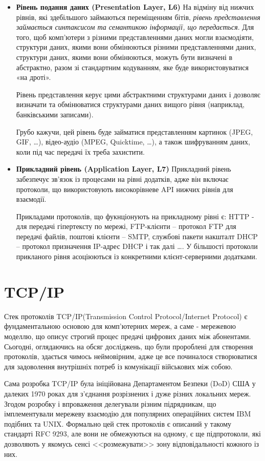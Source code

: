 \begin{itemize}
    \item \textbf{Рівень подання даних (Presentation Layer, L6)}
    На відміну від нижчих рівнів, які здебільшого займаються переміщенням бітів, \textit{рівень представлення займається синтаксисом та семантикою інформації, що передається}. Для того, щоб комп'ютери з різними представленнями даних могли взаємодіяти, структури даних, якими вони обмінюються різними представленнями даних, структури даних, якими вони обмінюються, можуть бути визначені в абстрактно, разом зі стандартним кодуванням, яке буде використовуватися «на дроті». 
    
    Рівень представлення керує цими абстрактними структурами даних і дозволяє визначати та обмінюватися структурами даних вищого рівня (наприклад, банківськими записами).

    Грубо кажучи, цей рівень буде займатися представленням картинок (JPEG, GIF, \dots), відео-аудіо (MPEG, Quicktime, \dots), а також шифруванням даних, коли під час передачі їх треба захистити.
    

    \item \textbf{Прикладний рівень (Application Layer, L7)}
    Прикладний рівень забезпечує зв'язок із процесами на рівні додатків, адже він включає протоколи, що використовують високорівневе API нижчих рівнів для взаємодії. 
    
    Прикладами протоколів, що фукнціонують на прикладному рівні є: HTTP - для передачі гіпертексту по мережі, FTP-клієнти -- протокол FTP для передачі файлів, поштові клієнти -- SMTP, службові пакети накшталт DHCP -- протокол призначення IP-адрес DHCP і так далі \dots. У більшості протоколи прикланого рівня асоціюються із конкретними клієнт-серверними додатками.    
\end{itemize}


\section{TCP/IP}

Стек протоколів TCP/IP(Transmission Control Protocol/Internet Protocol) є фундаментальною основою для комп'ютерних мереж, а саме - мережевою моделлю, що описує строгий процес предачі цифрових даних між абонентами. Сьогодні, оглядаючись на обсяг досліджень, що були пророблені для створення протоколів, здається чимось неймовірним, адже це все починалося створюватися для задоволення внутрішніх потреб із комунікації військових між собою.

Сама розробка TCP/IP була ініційована Департаментом Безпеки (DoD) США у далеких 1970 роках для з'єднання розрізнених і дуже різних локальних мереж. Згодом розробку і впроваження делегували різним підрядникам, що імплементували мережеву взаємодію для популярних операційних систем IBM подібних та UNIX. Формально цей стек протоколів є описаний у такому стандарті RFC 9293, але вони не обмежуються на одному, є ще підпротоколи, які дозволяють у якомусь сенсі <<розмежувати>> зону відповідальності кожного із них.

